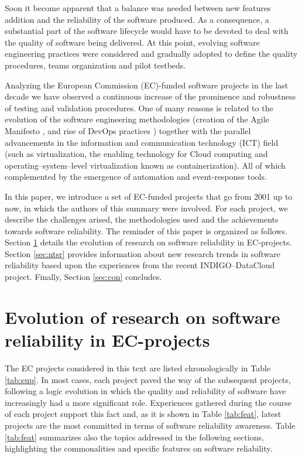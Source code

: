 \documentclass[journal]{IEEEtran}
\begin{document}
Soon it become apparent that a balance was needed between new features addition
and the reliability of the software produced. As a consequence, a substantial part of the
software lifecycle would have to be devoted to deal with the quality of software being
delivered. At this point, evolving software engineering practices were
considered and gradually adopted to define the quality procedures, teams
organization and pilot testbeds.

Analyzing the European Commission (EC)-funded software projects in the last decade
we have observed a continuous increase of the prominence and robustness of
testing and validation procedures. One of many reasons is related to the
evolution of the software engineering methodologies (creation of the Agile
Manifesto \cite{agile-manifesto}, and rise of DevOps practices \cite{zhu}) together
with the parallel advancements in the information and communication technology (ICT)
field (such as virtualization, the enabling technology for Cloud computing and 
operating--system--level virtualization known as containerization). All of which
complemented by the emergence of automation and event-response tools.

In this paper, we introduce a set of EC-funded projects
that go from 2001 up to now, in which the authors of this summary were involved.
For each project, we describe the challenges arised, the methodologies used and
the achievements towards software reliability. The reminder of this paper is
organized as follows. Section \ref{sec:ev} details the evolution of research on
software reliability in EC-projects. Section \ref{sec:ntsr} provides
information about new research trends in software reliability based upon the 
experiences from the recent INDIGO--DataCloud project. Finally, Section \ref{sec:con} concludes.

\section{Evolution of research on software reliability in EC-projects}
\label{sec:ev}

The EC projects considered in this text are listed chronologically in Table
\ref{tab:eup}. In most cases, each project paved the way of the subsequent projects,
following a logic evolution in which the quality and reliability of software have
increasingly had a more significant role. Experiences gathered during the 
course of each project support this fact and, as it is shown in Table \ref{tab:feat},
latest projects are the most committed in terms of software reliability awareness.
Table \ref{tab:feat} summarizes also the topics addressed in the following sections, highlighting 
the commonalities and specific features on software reliability.
\end{document}
